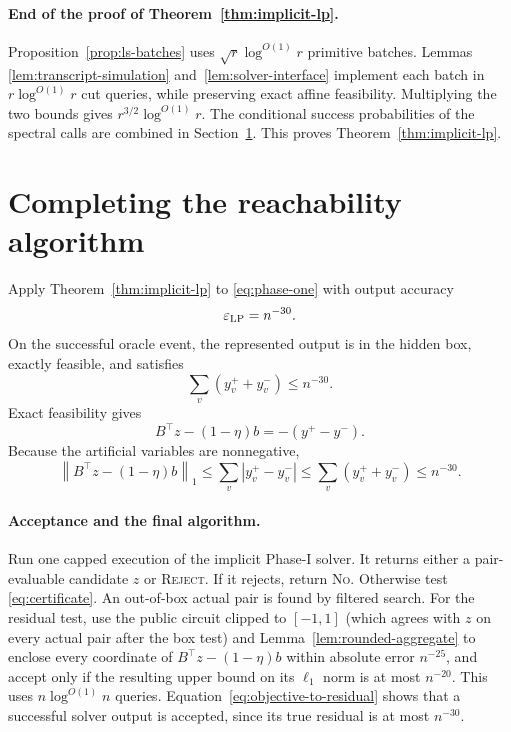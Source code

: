 \documentclass[11pt]{article}
\theoremstyle{definition}
\newcommand{\eps}{\varepsilon}
\newcommand{\norm}[1]{\left\lVert #1\right\rVert}
\begin{document}
\paragraph{End of the proof of Theorem~\ref{thm:implicit-lp}.}
Proposition~\ref{prop:ls-batches} uses
$\sqrt r\log^{O(1)}r$ primitive batches.  Lemmas
\ref{lem:transcript-simulation} and~\ref{lem:solver-interface} implement each
batch in $r\log^{O(1)}r$ cut queries, while preserving exact affine
feasibility.  Multiplying the two bounds gives
$r^{3/2}\log^{O(1)}r$.  The conditional success probabilities of the
spectral calls are combined in Section~\ref{sec:completion}.  This proves
Theorem~\ref{thm:implicit-lp}.
\section{Completing the reachability algorithm}
\label{sec:completion}

Apply Theorem~\ref{thm:implicit-lp} to \eqref{eq:phase-one} with output
accuracy
\[
        \eps_{\rm LP}=n^{-30}.
\]
On the successful oracle event, the represented output is in the hidden box,
exactly feasible, and satisfies
\begin{equation}\label{eq:artificial-objective}
        \sum_v(y_v^++y_v^-)\le n^{-30}.
\end{equation}
Exact feasibility gives
\[
 B^\top z-(1-\eta)b=-(y^+-y^-).
\]
Because the artificial variables are nonnegative,
\begin{equation}\label{eq:objective-to-residual}
 \norm{B^\top z-(1-\eta)b}_1
 \le\sum_v|y_v^+-y_v^-|
 \le\sum_v(y_v^++y_v^-)
 \le n^{-30}.
\end{equation}

\paragraph{Acceptance and the final algorithm.}
Run one capped execution of the implicit Phase-I solver.  It returns either a
pair-evaluable candidate $z$ or \textsc{Reject}.  If it rejects, return
\textsc{No}.  Otherwise test \eqref{eq:certificate}.  An out-of-box actual
pair is found by filtered search.  For the residual test, use
the public circuit clipped to $[-1,1]$ (which agrees with $z$ on every actual
pair after the box test) and Lemma~\ref{lem:rounded-aggregate} to enclose every coordinate of
$B^\top z-(1-\eta)b$ within absolute error $n^{-25}$, and accept only if the
resulting upper bound on its $\ell_1$ norm is at most $n^{-20}$.  This uses
$n\log^{O(1)}n$ queries.  Equation~\eqref{eq:objective-to-residual} shows that
a successful solver output is accepted, since its true residual is at most
$n^{-30}$.
\end{document}
